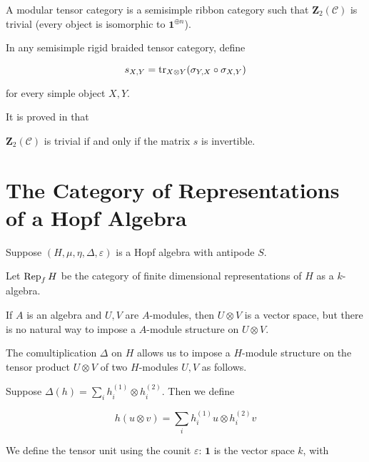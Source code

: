 \begin{defn}
    A modular tensor category is a semisimple ribbon category such that
    $\mathbf{Z}_2(\mathcal{C})$ is trivial (every object is isomorphic to
    $\mathbf{1}^{\oplus n}$). 

\end{defn}


In any semisimple rigid braided tensor category, define

\begin{equation}
    s_{X,Y} = \operatorname{tr}_{X \otimes Y}(\sigma_{Y,X} \circ \sigma_{X,Y})
\end{equation}

for every simple object $X,Y$.

It is proved in \cite{mueger2001} that
\begin{theorem}
    $\mathbf{Z}_2(\mathcal{C})$ is trivial if and only if the matrix $s$ is invertible. 
\end{theorem}


\section{The Category of Representations of a Hopf Algebra}

Suppose $(H, \mu, \eta, \Delta, \varepsilon)$ is a Hopf algebra with antipode $S$. 

Let $\operatorname{Rep}_f H$ be the category of finite dimensional representations of $H$ as
a $k$-algebra.

If $A$ is an algebra and $U, V$ are $A$-modules, then $U \otimes V$ is a vector
space, but there is no natural way to impose a $A$-module structure on $U
\otimes V$. 

The comultiplication $\Delta$ on $H$ allows us to impose a $H$-module structure
on the tensor product $U \otimes V$ of two $H$-modules $U,V$ as follows.

Suppose $\Delta(h) = \sum _{i} h^{(1)}_i \otimes h^{(2)}_i$. Then we define

\begin{equation}
    h (u \otimes v) = \sum_{i} h^{(1)}_i u \otimes h^{(2)}_i v
\end{equation}

We define the tensor unit using the counit $\varepsilon$: $\mathbf{1}$ is the
vector space $k$, with 

